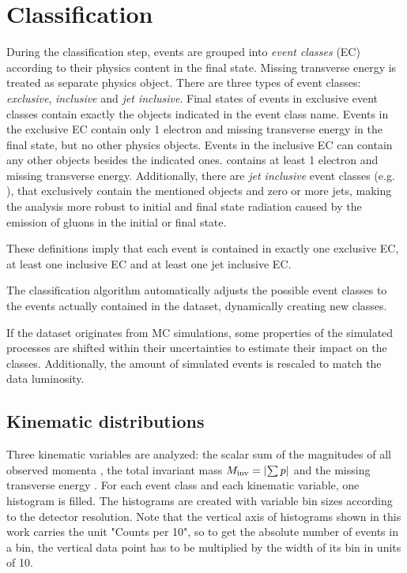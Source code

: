 \section{Classification}
During the classification step, events are grouped into \emph{event classes} (EC) according to their physics content in the final state. 
Missing transverse energy is treated as separate physics object. There are three  types of event classes: \emph{exclusive}, \emph{inclusive} and \emph{jet inclusive}. Final states of events in exclusive event classes contain exactly the objects indicated in the event class name. 
Events in the exclusive EC  contain only 1 electron and missing transverse energy in the final state, but no other physics objects.
Events in the inclusive EC can contain any other objects besides the indicated ones.  contains at least 1 electron and missing transverse energy. 
Additionally, there are \emph{jet inclusive} event classes (e.g. ), that exclusively contain the mentioned objects and zero or more jets, making the analysis more robust to initial and final state radiation caused by the emission of gluons in the initial or final state.

These definitions imply that each event is contained in exactly one exclusive EC, at least one inclusive EC and at least one jet inclusive EC.

The classification algorithm automatically adjusts the possible event classes to the events actually contained in the dataset, dynamically creating new classes. 

If the dataset originates from MC simulations, some properties of the simulated processes are shifted within their uncertainties to estimate their impact on the classes. Additionally, the amount of simulated events is rescaled to match the data luminosity.

\subsection{Kinematic distributions}
Three kinematic variables are analyzed: the scalar sum of the magnitudes of all observed momenta \sumpT, the total invariant mass ${M_\mathrm{inv}} = \abs{\sum p}$ and the missing transverse energy \MET.
For each event class and each kinematic variable, one histogram is filled. The histograms are created with variable bin sizes according to the detector resolution\cite[p. 52]{Papacz2014Model}. Note that the vertical axis of histograms shown in this work carries the unit "Counts per \unit{10}{\GeV}", so to get the absolute number of events in a bin, the vertical data point has to be multiplied by the width of its bin in units of \unit{10}{\GeV}.

